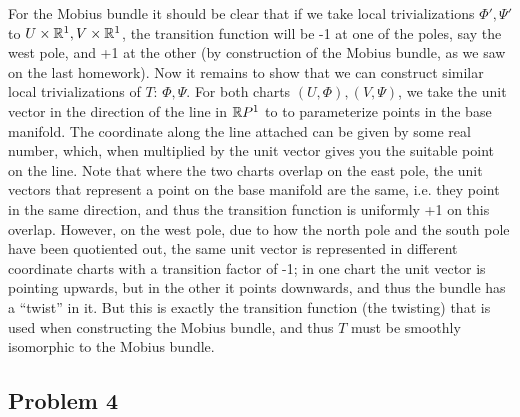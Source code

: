 \documentclass{../../mathnotes}
\begin{document}

For the Mobius bundle it should be clear that if we take local trivializations $\Phi',\Psi'$ to $U\times\mathbb{R}^1,V\times\mathbb{R}^1$,
the transition function will be -1 at one of the poles, say the west pole, and +1 at the other (by construction of the Mobius
bundle, as we saw on the last homework). Now it remains to show that we can construct similar local trivializations
of $T$: $\Phi,\Psi$. For both charts $(U,\Phi),(V,\Psi)$, we take the unit vector in the direction of the line in $\mathbb{R} P^1$
to to parameterize points in the base manifold. The coordinate along the line attached can be given by some real number, which,
when multiplied by the unit vector gives you the suitable point on the line. Note that where the two charts overlap on the
east pole, the unit vectors that represent a point on the base manifold are the same, i.e. they point in the same direction, and
thus the transition function is uniformly +1 on this overlap. However, on the west pole, due to how the north pole and the south
pole have been quotiented out, the same unit vector is represented in different coordinate charts with a transition factor of -1;
in one chart the unit vector is pointing upwards, but in the other it points downwards, and thus the bundle has a ``twist'' in it.
But this is exactly the transition function (the twisting) that is used when constructing the Mobius bundle, and thus $T$ must
be smoothly isomorphic to the Mobius bundle.

\subsection*{Problem 4}
\end{document}
